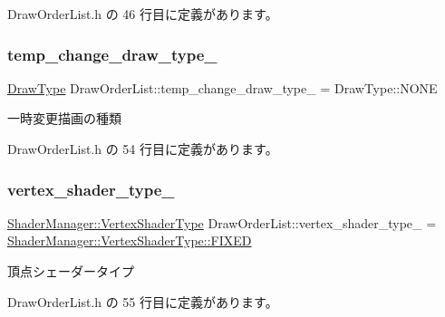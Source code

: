  Draw\+Order\+List.\+h の 46 行目に定義があります。

\mbox{\label{class_draw_order_list_a57edbe464013d515f591d2cc98bfcbd0}} 
\subsubsection{\texorpdfstring{temp\+\_\+change\+\_\+draw\+\_\+type\+\_\+}{temp\_change\_draw\_type\_}}
{\footnotesize\ttfamily \mbox{\hyperlink{class_draw_order_list_a6c9b9ceb312c16d399ef355f4f3486bb}{Draw\+Type}} Draw\+Order\+List\+::temp\+\_\+change\+\_\+draw\+\_\+type\+\_\+ = Draw\+Type\+::\+N\+O\+NE\hspace{0.3cm}{\ttfamily [private]}}



一時変更描画の種類 



 Draw\+Order\+List.\+h の 54 行目に定義があります。

\mbox{\label{class_draw_order_list_afcb0968108f4e6932358393a8bc90a8b}} 
\subsubsection{\texorpdfstring{vertex\+\_\+shader\+\_\+type\+\_\+}{vertex\_shader\_type\_}}
{\footnotesize\ttfamily \mbox{\hyperlink{class_shader_manager_a9b51e49d70eb3cc58f6d1f3994e8cfbd}{Shader\+Manager\+::\+Vertex\+Shader\+Type}} Draw\+Order\+List\+::vertex\+\_\+shader\+\_\+type\+\_\+ = \mbox{\hyperlink{class_shader_manager_a9b51e49d70eb3cc58f6d1f3994e8cfbdac6e6dc18b53b4c2681394b9d8aefcec7}{Shader\+Manager\+::\+Vertex\+Shader\+Type\+::\+F\+I\+X\+ED}}\hspace{0.3cm}{\ttfamily [private]}}



頂点シェーダータイプ 



 Draw\+Order\+List.\+h の 55 行目に定義があります。



